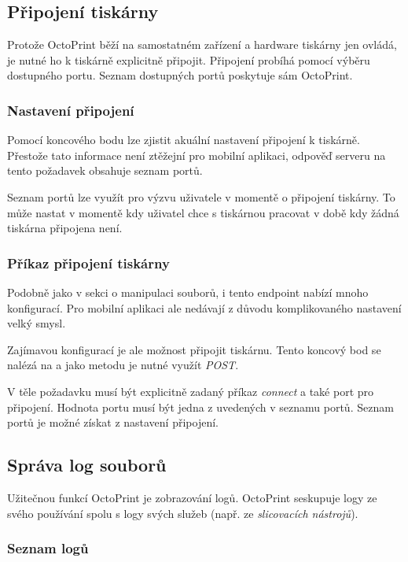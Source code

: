 \subsection{Připojení tiskárny}

Protože OctoPrint běží na samostatném zařízení a hardware tiskárny jen ovládá, je nutné ho k tiskárně explicitně připojit.
Připojení probíhá pomocí výběru dostupného portu.
Seznam dostupných portů poskytuje sám OctoPrint.

\subsubsection*{Nastavení připojení}

Pomocí koncového bodu  lze zjistit akuální nastavení připojení k tiskárně.
Přestože tato informace není ztěžejní pro mobilní aplikaci, odpověď serveru na tento požadavek obsahuje seznam portů.

Seznam portů lze využít pro výzvu uživatele v momentě o připojení tiskárny.
To může nastat v momentě kdy uživatel chce s tiskárnou pracovat v době kdy žádná tiskárna připojena není.

\subsubsection*{Příkaz připojení tiskárny}

Podobně jako v sekci o manipulaci souborů, i tento endpoint nabízí mnoho konfigurací.
Pro mobilní aplikaci ale nedávají z důvodu komplikovaného nastavení velký smysl.

Zajímavou konfigurací je ale možnost připojit tiskárnu.
Tento koncový bod se nalézá na  a jako metodu je nutné využít \textit{POST}.

V těle požadavku musí být explicitně zadaný příkaz \textit{connect} a také port pro připojení.
Hodnota portu musí být jedna z uvedených v seznamu portů.
Seznam portů je možné získat z nastavení připojení.

\subsection{Správa log souborů}

Užitečnou funkcí OctoPrint je zobrazování logů.
OctoPrint seskupuje logy ze svého používání spolu s logy svých služeb (např. ze \textit{slicovacích nástrojů}).

\subsubsection*{Seznam logů}

